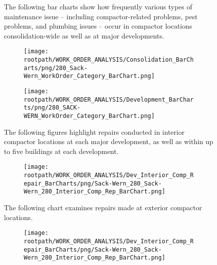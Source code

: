 \begin{figure}[h]
                                \sf
                                The following bar charts show how frequently various types of maintenance issue -- including compactor-related problems, pest problems, and plumbing issues -- occur in compactor locations consolidation-wide as well as at major developments.
                                \raggedright
                                \begin{subfigure}{\textwidth}
                                \texttt{[image: \\rootpath/WORK\_ORDER\_ANALYSIS/Consolidation\_BarCharts/png/280\_Sack-Wern\_WorkOrder\_Category\_BarChart.png]}
                                \end{subfigure}
                                \begin{subfigure}{\textwidth}
                                    \texttt{[image: \\rootpath/WORK\_ORDER\_ANALYSIS/Development\_BarCharts/png/280\_SACK-WERN\_WorkOrder\_Category\_BarChart.png]}
                                    \end{subfigure}
                                    \end{figure}\begin{figure}[h]
                                \raggedright
                                \sf
                                The following figures highlight repairs conducted in interior compactor locations at each major development, as well as within up to five buildings at each development.\\
                                \begin{subfigure}{\textwidth}
                                    \texttt{[image: \\rootpath/WORK\_ORDER\_ANALYSIS/Dev\_Interior\_Comp\_Repair\_BarCharts/png/Sack-Wern\_280\_Sack-Wern\_280\_Interior\_Comp\_Rep\_BarChart.png]}
                                    \end{subfigure}
                                    
                                    \end{figure}\begin{figure}[h]
                                \sf
                                \raggedright
                                The following chart examines repairs made at exterior compactor locations.
                                \sf
                                \begin{subfigure}{\textwidth}
                                    \texttt{[image: \\rootpath/WORK\_ORDER\_ANALYSIS/Dev\_Interior\_Comp\_Repair\_BarCharts/png/Sack-Wern\_280\_Sack-Wern\_280\_Interior\_Comp\_Rep\_BarChart.png]}
                                    \end{subfigure}
                                    \end{figure}
